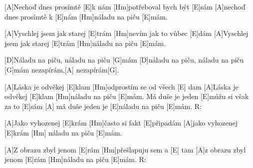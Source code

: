 
[A]Nechoď dnes prosímtě [E]k nám
[Hm]potřeboval bych být [E]sám
[A]nechoď dnes prosímtě k [E]nám
[Hm]náladu na piču [E]mám.

[A]Vyschlej jsem jak starej [E]trám
[Hm]nevím jak to vůbec [E]dám
[A]Vyschlej jsem jak starej [E]trám
[Hm]náladu na piču [E]mám.

[D]Náladu na piču, náladu na piču [G]mám
[D]náladu na piču, náladu na piču [G]mám
nezapírám,[A] nezapírám[G].

[A]Láska je odvěkej [E]klam
[Hm]odprostím se od všech [E] dam
[A]Láska je odvěkej [E]klam
[Hm]náladu na piču [E]mám.
\vfill\null
\columnbreak
[A]Má duše je jeden [E]můžu si však za to [E]sám
[A] má duše jeden je [E]náladu na piču [E]mám.
R:

[A]Jako vyhozenej [E]krám
[Hm]\null často si fakt [E]připadám
[A]jako vyhozenej [E]krám
[Hm] náladu na piču [E]mám.

[A]Z obrazu zbyl jenom [E]rám
[Hm]přešlapuju sem a [E] tam
[A]z obrazu zbyl jenom [E]rám
[Hm]náladu na piču [E]mám.
R: